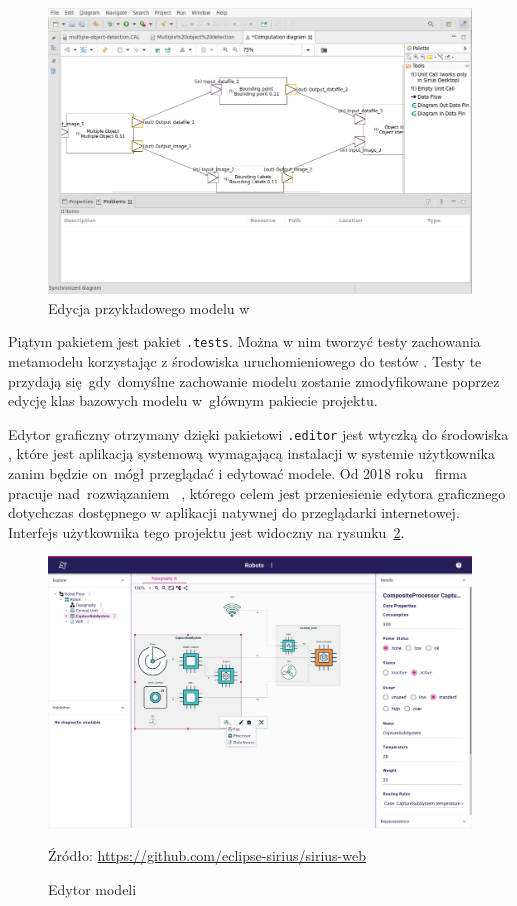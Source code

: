 \begin{figure}[!ht]
	\centering

	\includegraphics[width=0.95\linewidth]
	{./images/sirius-desktop-model-editor.png}
	\caption{Edycja przykładowego modelu w
		\SiriusDesktop{}}\label{rys:sirius-desktop-example-model}
\end{figure}

Piątym pakietem jest pakiet \texttt{.tests}. Można w nim tworzyć testy
zachowania metamodelu korzystając z środowiska uruchomieniowego do testów
\JUnit{}. Testy te przydają się~gdy~domyślne zachowanie modelu zostanie
zmodyfikowane poprzez edycję klas bazowych modelu w~głównym pakiecie projektu.

Edytor graficzny otrzymany dzięki pakietowi \texttt{.editor} jest wtyczką do
środowiska \Eclipse{}, które jest aplikacją systemową wymagającą instalacji
w systemie użytkownika zanim będzie on~mógł przeglądać i edytować modele.
Od 2018 roku~\cite{sirius-components-repo-first-commit} firma \Eclipse{}
pracuje nad~rozwiązaniem \SiriusWeb{}~\cite{sirius-web-github}, którego
celem jest przeniesienie edytora
graficznego dotychczas dostępnego w aplikacji natywnej do przeglądarki
internetowej. Interfejs użytkownika tego projektu jest widoczny na
rysunku~\ref{rys:sirius-web-ui}.

\begin{figure}[!ht]
	\centering

	\includegraphics[width=0.95\linewidth]
	{./images/sirius-web-editor.png}
	\caption{Edytor modeli \SiriusWeb{}}\label{rys:sirius-web-ui}
	{\small Źródło: \url{https://github.com/eclipse-sirius/sirius-web}}
\end{figure}

